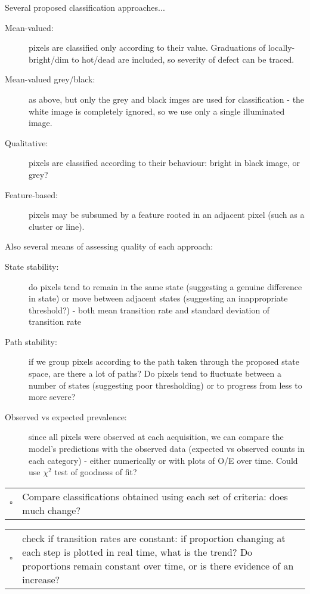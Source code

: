 \documentclass[10pt,fleqn]{article}
\renewcommand{\todo}[1]{
	\begin{minipage}{\textwidth}
	\textcolor{black}{
					\begin{tabular}{p{0.01\textwidth}p{0.95\textwidth}}
						$\square$ & #1
					\end{tabular}
					}
	\end{minipage}
}
\begin{document}
Several proposed classification approaches...

\begin{description}
\item[Mean-valued:] pixels are classified only according to their value. Graduations of locally-bright/dim to hot/dead are included, so severity of defect can be traced.

\item[Mean-valued grey/black:] as above, but only the grey and black imges are used for classification - the white image is completely ignored, so we use only a single illuminated image.

\item[Qualitative:] pixels are classified according to their behaviour: bright in black image, or grey?

\item[Feature-based:] pixels may be subsumed by a feature rooted in an adjacent pixel (such as a cluster or line).
\end{description}

\vspace{15pt}

Also several means of assessing quality of each approach:

\begin{description}

\item[State stability:] do pixels tend to remain in the same state (suggesting a genuine difference in state) or move between adjacent states (suggesting an inappropriate threshold?) - both mean transition rate and standard deviation of transition rate

\item[Path stability:] if we group pixels according to the path taken through the proposed state space, are there a lot of paths? Do pixels tend to fluctuate between a number of states (suggesting poor thresholding) or to progress from less to more severe?

\item[Observed vs expected prevalence:] since all pixels were observed at each acquisition, we can compare the model's predictions with the observed data (expected vs observed counts in each category) - either numerically or with plots of O/E over time. Could use $\chi^2$ test of goodness of fit?
\end{description}

\vspace{15pt}

\todo{Compare classifications obtained using each set of criteria: does much change?}

\todo{check if transition rates are constant: if proportion changing at each step is plotted in real time, what is the trend? Do proportions remain constant over time, or is there evidence of an increase?}


\end{document}
